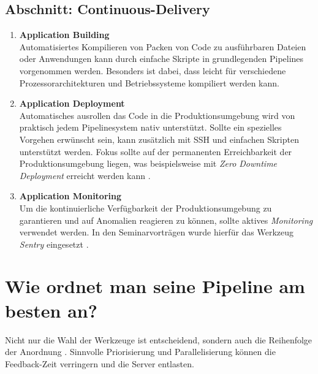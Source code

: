\subsection{Abschnitt: Continuous-Delivery}
\begin{enumerate}[resume]
    \itemsep-0.5em 
    \item \textbf{Application Building}\label{Application Building} \\
        Automatisiertes Kompilieren von Packen von Code zu ausführbaren Dateien oder Anwendungen kann durch einfache Skripte in grundlegenden Pipelines vorgenommen werden. Besonders ist dabei, dass leicht für verschiedene Prozessorarchitekturen und Betriebssysteme kompiliert werden kann.
    \item \textbf{Application Deployment}\label{Application Deployment} \\
        Automatisches ausrollen das Code in die Produktionsumgebung wird von praktisch jedem Pipelinesystem nativ unterstützt. Sollte ein spezielles Vorgehen erwünscht sein, kann zusätzlich mit SSH und einfachen Skripten unterstützt werden. Fokus sollte auf der permanenten Erreichbarkeit der Produktionsumgebung liegen, was beispielsweise mit \emph{Zero Downtime Deployment} erreicht werden kann \cite{craftquestWhatAreZero}. 
    \item \textbf{Application Monitoring}\label{Application Monitoring} \\
        Um die kontinuierliche Verfügbarkeit der Produktionsumgebung zu garantieren und auf Anomalien reagieren zu können, sollte aktives \emph{Monitoring} verwendet werden. In den Seminarvorträgen wurde hierfür das Werkzeug \emph{Sentry} eingesetzt \cite{sentryApplicationMonitoringError}.
\end{enumerate}

\section{Wie ordnet man seine Pipeline am besten an?}

Nicht nur die Wahl der Werkzeuge ist entscheidend, sondern auch die Reihenfolge der Anordnung \cite{nemytchenkoGitLabCIRun2016}. 
Sinnvolle Priorisierung und Parallelisierung können die Feedback-Zeit verringern und die Server entlasten. 


